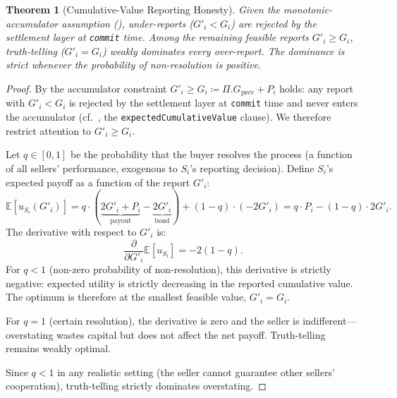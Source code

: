 \documentclass[11pt,a4paper]{article}
\newtheorem{theorem}{Theorem}[section]
\theoremstyle{definition}
\theoremstyle{remark}
\newcommand{\pay}{P}           %
\newcommand{\cumval}{G}        %
\begin{document}
\begin{theorem}[Cumulative-Value Reporting Honesty]
\label{thm:self-enforcing-reporting}
Given the monotonic-accumulator assumption
(), under-reports
($\cumval'_i < \cumval_i$) are rejected by the settlement layer at
\texttt{commit} time. Among the remaining feasible reports
$\cumval'_i \geq \cumval_i$, truth-telling
($\cumval'_i = \cumval_i$) weakly dominates every over-report. The
dominance is strict whenever the probability of non-resolution is
positive.
\end{theorem}

\begin{proof}
By  the accumulator constraint
$\cumval'_i \geq \cumval_i \coloneqq \Pi.\cumval_{\text{prev}} + \pay_i$
holds: any report with $\cumval'_i < \cumval_i$ is rejected by the
settlement layer at \texttt{commit} time and never enters the
accumulator (cf.\ , the
\texttt{expectedCumulativeValue} clause). We therefore restrict
attention to $\cumval'_i \geq \cumval_i$.

Let $q \in [0, 1]$ be the probability that the buyer resolves the
process (a function of all sellers' performance, exogenous to $S_i$'s
reporting decision). Define $S_i$'s expected payoff as a function of
the report $\cumval'_i$:
\begin{equation}
  \mathbb{E}[u_{S_i}(\cumval'_i)]
    = q \cdot (\underbrace{2\cumval'_i + \pay_i}_{\text{payout}}
             - \underbrace{2\cumval'_i}_{\text{bond}})
    + (1 - q) \cdot (-2\cumval'_i)
    = q \cdot \pay_i - (1 - q) \cdot 2\cumval'_i.
  \label{eq:reporting-expected-utility}
\end{equation}
The derivative with respect to $\cumval'_i$ is:
\begin{equation}
  \frac{\partial}{\partial \cumval'_i}
    \mathbb{E}[u_{S_i}] = -2(1 - q).
  \label{eq:reporting-derivative}
\end{equation}
For $q < 1$ (non-zero probability of non-resolution), this derivative
is strictly negative: expected utility is strictly decreasing in the
reported cumulative value. The optimum is therefore at the smallest
feasible value, $\cumval'_i = \cumval_i$.

For $q = 1$ (certain resolution), the derivative is zero and the
seller is indifferent---overstating wastes capital but does not
affect the net payoff. Truth-telling remains weakly optimal.

Since $q < 1$ in any realistic setting (the seller cannot guarantee
other sellers' cooperation), truth-telling strictly dominates
overstating.
\end{proof}
\end{document}
